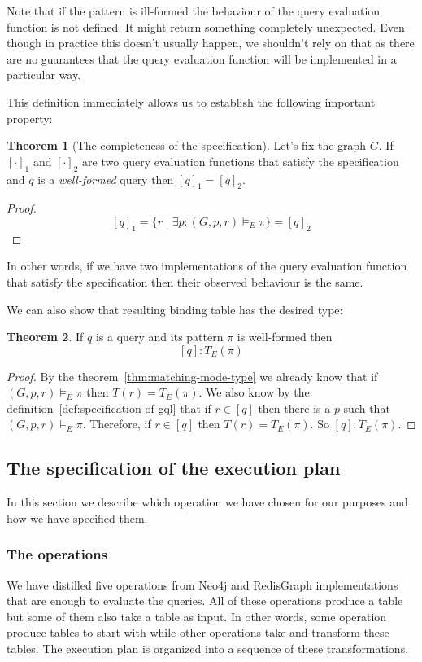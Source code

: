 \documentclass[14pt]{constructor-thesis}
\theoremstyle{definition}
\newtheorem{theorem}{Theorem}
\begin{document}
Note that if the pattern is ill-formed the behaviour of the query evaluation function is not defined. It might return something completely unexpected. Even though in practice this doesn't usually happen, we shouldn't rely on that as there are no guarantees that the query evaluation function will be implemented in a particular way.

This definition immediately allows us to establish the following important property:
\begin{theorem}[The completeness of the specification]
  Let's fix the graph $G$.
  If $[\cdot]_1$ and $[\cdot]_2$ are two query evaluation functions that satisfy the specification and $q$ is a \textit{well-formed} query then $[q]_1 = [q]_2$.
\end{theorem}
\begin{proof}
  $$[q]_1 = \{ r \mid \exists p : (G, p, r) \models_E \pi \} = [q]_2$$
\end{proof}

In other words, if we have two implementations of the query evaluation function that satisfy the specification then their observed behaviour is the same.

We can also show that resulting binding table has the desired type:
\begin{theorem}
  If $q$ is a query and its pattern $\pi$ is well-formed then
  $$[q] : T_E(\pi)$$
\end{theorem}
\begin{proof}
  By the theorem~\ref{thm:matching-mode-type} we already know that if $(G, p, r) \models_E \pi$ then $T(r) = T_E(\pi)$. We also know by the definition~\ref{def:specification-of-gql} that if $r \in [q]$ then there is a $p$ such that $(G, p, r) \models_E \pi$. Therefore, if $r \in [q]$ then $T(r) = T_E(\pi)$. So $[q] : T_E(\pi)$.
\end{proof}

\subsection{The specification of the execution plan}

In this section we describe which operation we have chosen for our purposes and how we have specified them.

\subsubsection{The operations}

We have distilled five operations from Neo4j and RedisGraph implementations that are enough to evaluate the queries. All of these operations produce a table but some of them also take a table as input. In other words, some operation produce tables to start with while other operations take and transform these tables. The execution plan is organized into a sequence of these transformations.
\end{document}
